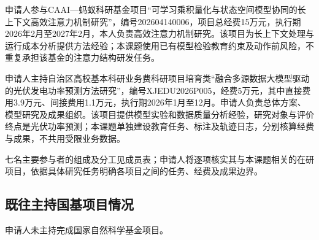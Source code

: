 申请人参与CAAI—蚂蚁科研基金项目“可学习乘积量化与状态空间模型协同的长上下文高效注意力机制研究”，编号202604140006，项目总经费15万元，执行期2026年2月至2027年2月，本人负责高效注意力机制研究。该项目为长上下文处理与运行成本分析提供方法经验；本课题使用已有模型检验教育约束及动作前风险，不重复承担该基金的注意力结构研发任务。

申请人主持自治区高校基本科研业务费科研项目培育类“融合多源数据大模型驱动的光伏发电功率预测方法研究”，编号XJEDU2026P005，经费5万元，其中直接费用3.9万元、间接费用1.1万元，执行期2026年1月至12月。申请人负责总体方案、模型研究及成果组织。该项目提供模型实验和数据质量分析经验，研究对象与评价终点是光伏功率预测；本课题单独建设教育任务、标注及轨迹日志，分别核算经费与成果，不共用受限业务数据。

七名主要参与者的组成及分工见成员表；申请人将逐项核实其与本课题相关的在研项目，依据具体研究任务明确各项目之间的任务、经费及成果边界。

\subsection{既往主持国基项目情况}

申请人未主持完成国家自然科学基金项目。
